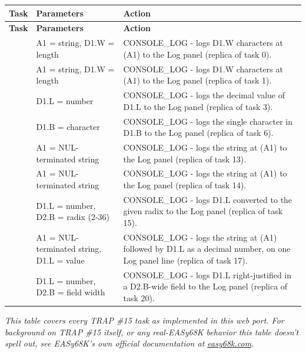 \begin{longtable}{@{}p{1.7cm}p{5.2cm}p{7.3cm}@{}}
\toprule
\textbf{Task} & \textbf{Parameters} & \textbf{Action} \\
\midrule
\endfirsthead
\toprule
\textbf{Task} & \textbf{Parameters} & \textbf{Action} \\
\midrule
\endhead
\ttfamily 200 & A1 = string, D1.W = length & CONSOLE\_LOG - logs D1.W characters at (A1) to the Log panel (replica of task 0). \\
\ttfamily 201 & A1 = string, D1.W = length & CONSOLE\_LOG - logs D1.W characters at (A1) to the Log panel (replica of task 1). \\
\ttfamily 203 & D1.L = number & CONSOLE\_LOG - logs the decimal value of D1.L to the Log panel (replica of task 3). \\
\ttfamily 206 & D1.B = character & CONSOLE\_LOG - logs the single character in D1.B to the Log panel (replica of task 6). \\
\ttfamily 213 & A1 = NUL-terminated string & CONSOLE\_LOG - logs the string at (A1) to the Log panel (replica of task 13). \\
\ttfamily 214 & A1 = NUL-terminated string & CONSOLE\_LOG - logs the string at (A1) to the Log panel (replica of task 14). \\
\ttfamily 215 & D1.L = number, D2.B = radix (2-36) & CONSOLE\_LOG - logs D1.L converted to the given radix to the Log panel (replica of task 15). \\
\ttfamily 217 & A1 = NUL-terminated string, D1.L = value & CONSOLE\_LOG - logs the string at (A1) followed by D1.L as a decimal number, on one Log panel line (replica of task 17). \\
\ttfamily 220 & D1.L = number, D2.B = field width & CONSOLE\_LOG - logs D1.L right-justified in a D2.B-wide field to the Log panel (replica of task 20). \\
\bottomrule
\end{longtable}
\par\noindent\textit{This table covers every TRAP \#15 task as implemented in this web port. For background on TRAP \#15 itself, or any real-EASy68K behavior this table doesn't spell out, see EASy68K's own official documentation at \href{http://www.easy68k.com/}{easy68k.com}.}\par\medskip

